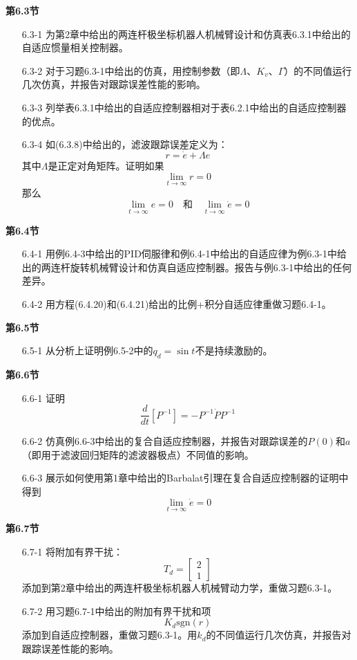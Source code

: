\documentclass[12pt,a4paper]{ctexart}
\begin{document}
\textbf{第6.3节}

\begin{enumerate}
\item[6.3-1] 为第2章中给出的两连杆极坐标机器人机械臂设计和仿真表6.3.1中给出的自适应惯量相关控制器。

\item[6.3-2] 对于习题6.3-1中给出的仿真，用控制参数（即$\Lambda$、$K_v$、$\Gamma$）的不同值运行几次仿真，并报告对跟踪误差性能的影响。

\item[6.3-3] 列举表6.3.1中给出的自适应控制器相对于表6.2.1中给出的自适应控制器的优点。

\item[6.3-4] 如(6.3.8)中给出的，滤波跟踪误差定义为：
\[
r = \dot{e} + \Lambda e
\]
其中$\Lambda$是正定对角矩阵。证明如果
\[
\lim_{t \to \infty} r = 0
\]
那么
\[
\lim_{t \to \infty} e = 0 \quad \text{和} \quad \lim_{t \to \infty} \dot{e} = 0
\]
\end{enumerate}

\textbf{第6.4节}

\begin{enumerate}
\item[6.4-1] 用例6.4-3中给出的PID伺服律和例6.4-1中给出的自适应律为例6.3-1中给出的两连杆旋转机械臂设计和仿真自适应控制器。报告与例6.3-1中给出的任何差异。

\item[6.4-2] 用方程(6.4.20)和(6.4.21)给出的比例+积分自适应律重做习题6.4-1。
\end{enumerate}

\textbf{第6.5节}

\begin{enumerate}
\item[6.5-1] 从分析上证明例6.5-2中的$q_d = \sin t$不是持续激励的。
\end{enumerate}

\textbf{第6.6节}

\begin{enumerate}
\item[6.6-1] 证明
\[
\frac{d}{dt}[P^{-1}] = -P^{-1}\dot{P}P^{-1}
\]

\item[6.6-2] 仿真例6.6-3中给出的复合自适应控制器，并报告对跟踪误差的$P(0)$和$a$（即用于滤波回归矩阵的滤波器极点）不同值的影响。

\item[6.6-3] 展示如何使用第1章中给出的Barbalat引理在复合自适应控制器的证明中得到
\[
\lim_{t \to \infty} \dot{e} = 0
\]
\end{enumerate}

\textbf{第6.7节}

\begin{enumerate}
\item[6.7-1] 将附加有界干扰：
\[
T_d = \begin{bmatrix} 2 \\ 1 \end{bmatrix}
\]
添加到第2章中给出的两连杆极坐标机器人机械臂动力学，重做习题6.3-1。

\item[6.7-2] 用习题6.7-1中给出的附加有界干扰和项
\[
K_d \text{sgn}(r)
\]
添加到自适应控制器，重做习题6.3-1。用$k_d$的不同值运行几次仿真，并报告对跟踪误差性能的影响。
\end{enumerate}
\end{document}
